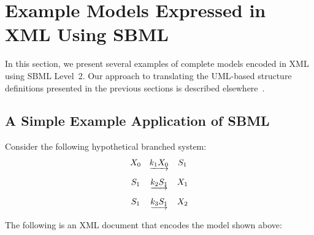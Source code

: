 \documentclass[10pt,twocolumntoc]{cekarticle}
\begin{document}
\section{Example Models Expressed in XML Using SBML}
\label{sec:xml-rep}

In this section, we present several examples of complete models
encoded in XML using SBML Level~2.  Our approach to translating
the UML-based structure definitions presented in the previous
sections is described elsewhere~\citep{hucka:2000b}.


\subsection{A Simple Example Application of SBML}
\label{sec:modeleg}

Consider the following hypothetical branched system:
\begin{equation*}
  \begin{array}{@{}ccc@{}}
    X_0 & \underrightarrow{k_1 X_0} & S_1 \\ \\[-4pt]
    S_1 & \underrightarrow{k_2 S_1} & X_1 \\ \\[-4pt]
    S_1 & \underrightarrow{k_3 S_1} & X_2
  \end{array}
\end{equation*}

The following is an XML document that encodes the model shown
above:
\end{document}
